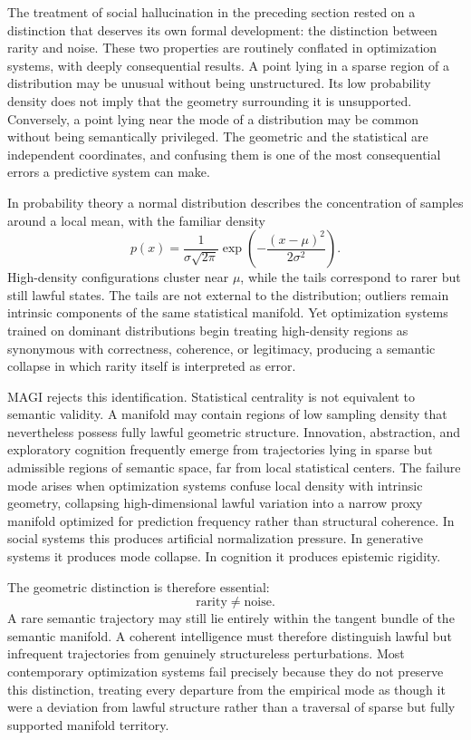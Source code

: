 \documentclass[11pt,a4paper,twocolumn]{article}
\begin{document}
The treatment of social hallucination in the preceding section
rested on a distinction that deserves its own formal development:
the distinction between rarity and noise. These two properties
are routinely conflated in optimization systems, with deeply
consequential results. A point lying in a sparse region of a
distribution may be unusual without being unstructured. Its low
probability density does not imply that the geometry surrounding
it is unsupported. Conversely, a point lying near the mode of a
distribution may be common without being semantically privileged.
The geometric and the statistical are independent coordinates, and
confusing them is one of the most consequential errors a predictive
system can make.

In probability theory a normal distribution describes the
concentration of samples around a local mean, with the familiar
density
\[
p(x)
=
\frac{1}{\sigma \sqrt{2\pi}}
\exp\!\left(
-\frac{(x-\mu)^2}{2\sigma^2}
\right).
\]
High-density configurations cluster near $\mu$, while the tails
correspond to rarer but still lawful states. The tails are not
external to the distribution; outliers remain intrinsic components
of the same statistical manifold. Yet optimization systems trained
on dominant distributions begin treating high-density regions as
synonymous with correctness, coherence, or legitimacy, producing
a semantic collapse in which rarity itself is interpreted as error.

MAGI rejects this identification. Statistical centrality is not
equivalent to semantic validity. A manifold may contain regions of
low sampling density that nevertheless possess fully lawful
geometric structure. Innovation, abstraction, and exploratory
cognition frequently emerge from trajectories lying in sparse
but admissible regions of semantic space, far from local
statistical centers. The failure mode arises when optimization
systems confuse local density with intrinsic geometry, collapsing
high-dimensional lawful variation into a narrow proxy manifold
optimized for prediction frequency rather than structural
coherence. In social systems this produces artificial normalization
pressure. In generative systems it produces mode collapse. In
cognition it produces epistemic rigidity.

The geometric distinction is therefore essential:
\[
\text{rarity} \neq \text{noise}.
\]
A rare semantic trajectory may still lie entirely within the
tangent bundle of the semantic manifold. A coherent intelligence
must therefore distinguish lawful but infrequent trajectories
from genuinely structureless perturbations. Most contemporary
optimization systems fail precisely because they do not preserve
this distinction, treating every departure from the empirical mode
as though it were a deviation from lawful structure rather than
a traversal of sparse but fully supported manifold territory.
\end{document}
